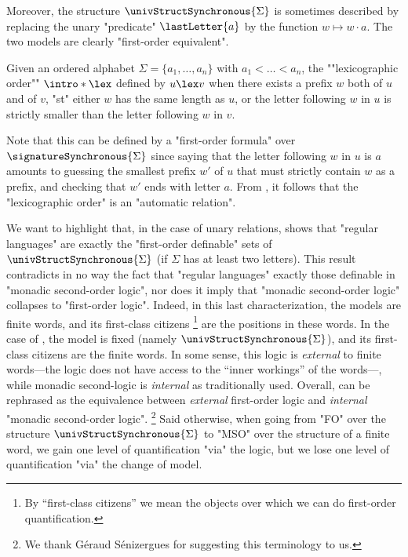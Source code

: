 Moreover, the structure $\univStructSynchronous{\Sigma}$ is sometimes described by replacing
the unary "predicate" $\lastLetter{a}$ by the function $w \mapsto w\cdot a$.
The two models are clearly "first-order equivalent".

\begin{example}
	\AP\label{ex:lexicographic-is-automatic}
	Given an ordered alphabet $\Sigma = \{a_1,\dotsc,a_n\}$ with $a_1 < \dotsc < a_n$,
	the \AP""lexicographic order"" $\intro*\lex$ defined by $u \lex v$ when there exists 
	a prefix $w$ both of $u$ and of $v$, "st" either $w$ has the same length as $u$,
	or the letter following $w$ in $u$ is strictly smaller than the letter following $w$ in $v$.
	
	Note that this can be defined by a "first-order formula" over $\signatureSynchronous{\Sigma}$
	since saying that the letter following $w$ in $u$ is $a$ amounts to
	guessing the smallest prefix $w'$ of $u$ that must strictly contain $w$ as a prefix,
	and checking that $w'$ ends with letter $a$.
	From , it follows that the "lexicographic order"
	is an "automatic relation".
\end{example}

We want to highlight that, in the case of unary relations,
 shows that "regular languages" are exactly
the "first-order definable" sets of $\univStructSynchronous{\Sigma}$
(if $\Sigma$ has at least two letters).
This result contradicts in no way the fact that "regular languages" exactly those definable
in "monadic second-order logic", nor does it imply that "monadic second-order logic"
collapses to "first-order logic". Indeed, in this last characterization,
the models are finite words, and its first-class citizens%
\footnote{By ``first-class citizens'' we mean the objects over which
we can do first-order quantification.} are the positions in these words.
In the case of , the model is fixed (namely $\univStructSynchronous{\Sigma}$), and its first-class citizens are the finite words.
In some sense, this logic is \emph{external} to finite words---the logic does not have access to the
``inner workings'' of the words---, while monadic second-logic is \emph{internal}
as traditionally used.
Overall,  can be rephrased as the equivalence between
\emph{external} first-order logic and \emph{internal} "monadic second-order logic".%
\footnote{We thank Géraud Sénizergues for suggesting this terminology to us.}
Said otherwise, when going from "FO" over the structure $\univStructSynchronous{\Sigma}$ to "MSO" 
over the structure of a finite word, we gain one level of quantification "via" the logic,
but we lose one level of quantification "via" the change of model.
 

